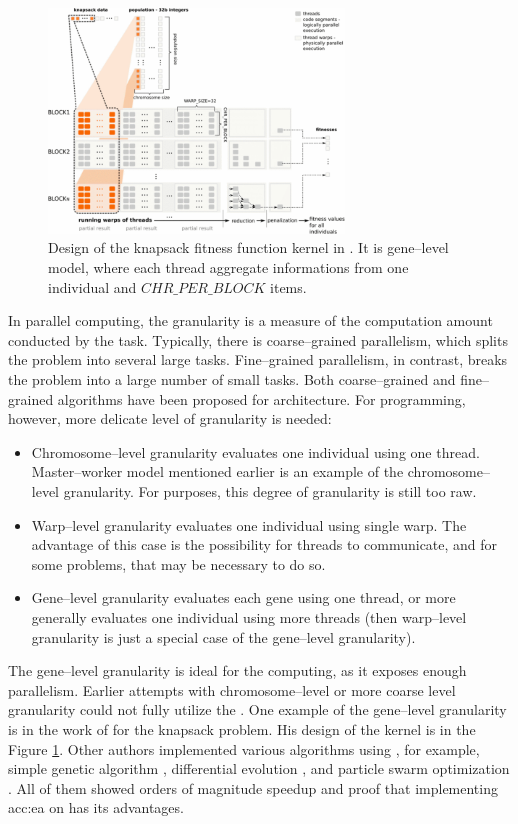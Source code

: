 \begin{figure}[hb!]
    \centering
    \includegraphics[width=0.7\textwidth]{img/KnapsackKernelDesign.png}
    \caption[CUDA evaluation kernel of knapsack problem]{Design of the knapsack fitness function kernel in \citet{GpuIsland}. It is gene--level model, where each thread aggregate informations from one individual and $CHR\_PER\_BLOCK$ items.}
    \label{fig:knapsackkernel}
\end{figure}

In parallel computing, the granularity is a measure of the computation amount conducted by the task. Typically, there is coarse--grained parallelism, which splits the problem into several large tasks. Fine--grained parallelism, in contrast, breaks the problem into a large number of small tasks. Both coarse--grained and fine--grained algorithms have been proposed for \cpu architecture. For \gpu programming, however, more delicate level of granularity is needed:
\begin{itemize}
    \item Chromosome--level granularity evaluates one individual using one thread. Master--worker model mentioned earlier is an example of the chromosome--level granularity. For \cuda purposes, this degree of granularity is still too raw.
    \item Warp--level granularity evaluates one individual using single warp. The advantage of this case is the possibility for threads to communicate, and for some problems, that may be necessary to do so.
    \item Gene--level granularity evaluates each gene using one thread, or more generally evaluates one individual using more threads (then warp--level granularity is just a special case of the gene--level granularity).     
\end{itemize}
The gene--level granularity is ideal for the \gpu computing, as it exposes enough parallelism. Earlier attempts with chromosome--level or more coarse level granularity could not fully utilize the \gpuns. One example of the gene--level granularity is in the work of \citet*{GpuIsland} for the knapsack problem. His design of the \cuda kernel is in the Figure \ref{fig:knapsackkernel}. Other authors implemented various algorithms using \cudans, for example, simple genetic algorithm \citep{SimpleGACUDA}, differential evolution \citep{veronese2010differential}, and particle swarm optimization \citep{PSOCUDA}. All of them showed orders of magnitude speedup and proof that implementing \acrlong{acc:ea} on \gpu has its advantages.
